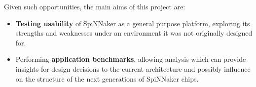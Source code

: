 Given such opportunities, the main aims of this project are:

\begin{itemize}
	\item \textbf{Testing usability} of SpiNNaker as a general purpose platform, exploring its strengths and weaknesses under an environment it was not originally designed for.
	\item Performing \textbf{application benchmarks}, allowing analysis which can provide insights for design decisions to the current architecture and possibly influence on the structure of the next generations of SpiNNaker chips.
\end{itemize}